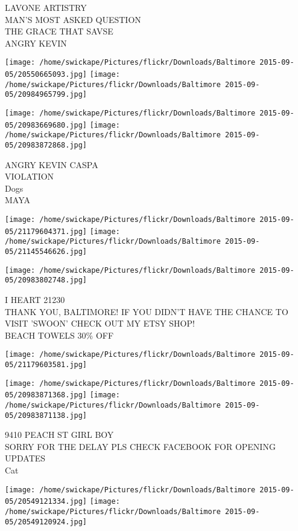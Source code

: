 \documentclass[10pt,letterpaper]{article}
\begin{document}
LAVONE ARTISTRY\\
MAN'S MOST ASKED QUESTION\\
THE GRACE THAT SAVSE\\
ANGRY KEVIN\\
\pagebreak

\texttt{[image: /home/swickape/Pictures/flickr/Downloads/Baltimore 2015-09-05/20550665093.jpg]}
\texttt{[image: /home/swickape/Pictures/flickr/Downloads/Baltimore 2015-09-05/20984965799.jpg]}

\texttt{[image: /home/swickape/Pictures/flickr/Downloads/Baltimore 2015-09-05/20983669680.jpg]}
\texttt{[image: /home/swickape/Pictures/flickr/Downloads/Baltimore 2015-09-05/20983872868.jpg]}

ANGRY KEVIN CASPA\\
VIOLATION\\
Dogs\\
MAYA\\
\pagebreak

\texttt{[image: /home/swickape/Pictures/flickr/Downloads/Baltimore 2015-09-05/21179604371.jpg]}
\texttt{[image: /home/swickape/Pictures/flickr/Downloads/Baltimore 2015-09-05/21145546626.jpg]}

\texttt{[image: /home/swickape/Pictures/flickr/Downloads/Baltimore 2015-09-05/20983802748.jpg]}

I HEART 21230\\
THANK YOU, BALTIMORE!  IF YOU DIDN'T HAVE THE CHANCE TO VISIT 'SWOON' CHECK OUT MY ETSY SHOP!\\
BEACH TOWELS 30\% OFF\\
\pagebreak

\texttt{[image: /home/swickape/Pictures/flickr/Downloads/Baltimore 2015-09-05/21179603581.jpg]}

\vspace{0.25in}
\texttt{[image: /home/swickape/Pictures/flickr/Downloads/Baltimore 2015-09-05/20983871368.jpg]}
\texttt{[image: /home/swickape/Pictures/flickr/Downloads/Baltimore 2015-09-05/20983871138.jpg]}

9410 PEACH ST GIRL BOY\\
SORRY FOR THE DELAY PLS CHECK FACEBOOK FOR OPENING UPDATES\\
Cat\\
\pagebreak

\texttt{[image: /home/swickape/Pictures/flickr/Downloads/Baltimore 2015-09-05/20549121334.jpg]}
\texttt{[image: /home/swickape/Pictures/flickr/Downloads/Baltimore 2015-09-05/20549120924.jpg]}
\end{document}
